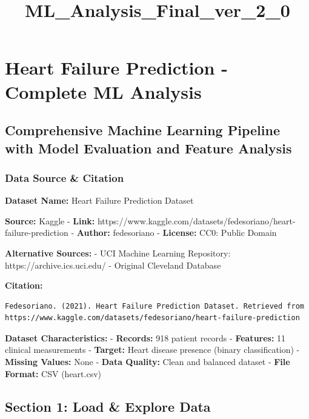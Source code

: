 \documentclass[11pt]{article}
\title{ML\_Analysis\_Final\_ver\_2\_0}
\begin{document}
    
    \maketitle
    
    

    
    \section{Heart Failure Prediction - Complete ML
Analysis}\label{heart-failure-prediction---complete-ml-analysis}

\subsection{Comprehensive Machine Learning Pipeline with Model
Evaluation and Feature
Analysis}\label{comprehensive-machine-learning-pipeline-with-model-evaluation-and-feature-analysis}

    \subsubsection{Data Source \& Citation}\label{data-source-citation}

\textbf{Dataset Name:} Heart Failure Prediction Dataset

\textbf{Source:} Kaggle - \textbf{Link:}
https://www.kaggle.com/datasets/fedesoriano/heart-failure-prediction -
\textbf{Author:} fedesoriano - \textbf{License:} CC0: Public Domain

\textbf{Alternative Sources:} - UCI Machine Learning Repository:
https://archive.ics.uci.edu/ - Original Cleveland Database

\textbf{Citation:}

\begin{verbatim}
Fedesoriano. (2021). Heart Failure Prediction Dataset. Retrieved from
https://www.kaggle.com/datasets/fedesoriano/heart-failure-prediction
\end{verbatim}

\textbf{Dataset Characteristics:} - \textbf{Records:} 918 patient
records - \textbf{Features:} 11 clinical measurements - \textbf{Target:}
Heart disease presence (binary classification) - \textbf{Missing
Values:} None - \textbf{Data Quality:} Clean and balanced dataset -
\textbf{File Format:} CSV (heart.csv)

    \subsection{Section 1: Load \& Explore
Data}\label{section-1-load-explore-data}
\end{document}
